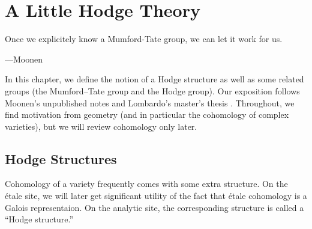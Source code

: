 \documentclass[../thesis.tex]{subfiles}
\begin{document}
\chapter{A Little Hodge Theory} \label{chap:hodge}

\epigraph{Once we explicitely know a Mumford-Tate group, we can let it work for us.}
{---Moonen \cite[(5.5)]{moonen-mumford-tate-intro}}

In this chapter, we define the notion of a Hodge structure as well as some related groups (the Mumford--Tate group and the Hodge group). Our exposition follows Moonen's unpublished notes \cite{moonen-mumford-tate-intro,moonen-mumford-tate} and Lombardo's master's thesis \cite[Chapter~3]{lombardo-mumford-tate}. Throughout, we find motivation from geometry (and in particular the cohomology of complex varieties), but we will review cohomology only later.

\section{Hodge Structures}
Cohomology of a variety frequently comes with some extra structure. On the \'etale site, we will later get significant utility of the fact that \'etale cohomology is a Galois representaion. On the analytic site, the corresponding structure is called a ``Hodge structure.''
\end{document}
